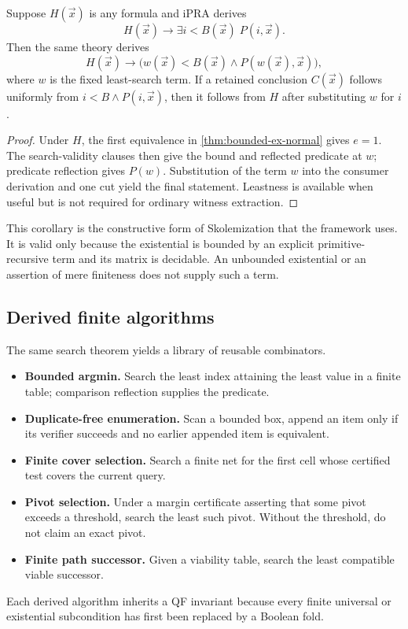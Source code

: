 \begin{corollary}\label{cor:bounded-skolem}
Suppose \(H(\vec x)\) is any formula and iPRA derives
\[
 H(\vec x)\to\exists i<B(\vec x)\;P(i,\vec x).
\]
Then the same theory derives
\[
 H(\vec x)\to
 \bigl(w(\vec x)<B(\vec x)\wedge P(w(\vec x),\vec x)\bigr),
\]
where \(w\) is the fixed least-search term.  If a retained conclusion \(C(\vec x)\) follows uniformly from
\(i<B\wedge P(i,\vec x)\), then it follows from \(H\) after substituting \(w\) for \(i\).
\end{corollary}

\begin{proof}
Under \(H\), the first equivalence in \cref{thm:bounded-ex-normal} gives \(e=1\).  The search-validity clauses then give the bound and reflected predicate at \(w\); predicate reflection gives \(P(w)\).  Substitution of the term \(w\) into the consumer derivation and one cut yield the final statement.  Leastness is available when useful but is not required for ordinary witness extraction.
\end{proof}

This corollary is the constructive form of Skolemization that the framework uses.  It is valid only because the existential is bounded by an explicit primitive-recursive term and its matrix is decidable.  An unbounded existential or an assertion of mere finiteness does not supply such a term.

\subsection{Derived finite algorithms}

The same search theorem yields a library of reusable combinators.
\begin{itemize}
  \item \textbf{Bounded argmin.}  Search the least index attaining the least value in a finite table; comparison reflection supplies the predicate.
  \item \textbf{Duplicate-free enumeration.}  Scan a bounded box, append an item only if its verifier succeeds and no earlier appended item is equivalent.
  \item \textbf{Finite cover selection.}  Search a finite net for the first cell whose certified test covers the current query.
  \item \textbf{Pivot selection.}  Under a margin certificate asserting that some pivot exceeds a threshold, search the least such pivot.  Without the threshold, do not claim an exact pivot.
  \item \textbf{Finite path successor.}  Given a viability table, search the least compatible viable successor.
\end{itemize}
Each derived algorithm inherits a QF invariant because every finite universal or existential subcondition has first been replaced by a Boolean fold.

